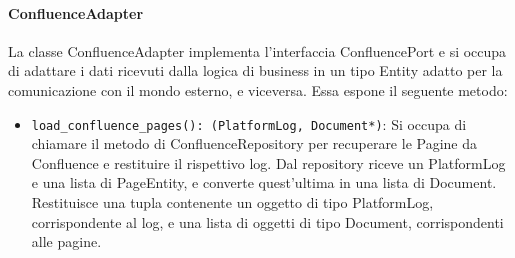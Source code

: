 \paragraph{ConfluenceAdapter}
\label{sec:confluence_adapter}
La classe ConfluenceAdapter implementa l'interfaccia ConfluencePort e si occupa di adattare i dati ricevuti dalla logica di business in un tipo Entity adatto per la comunicazione con il mondo esterno, e viceversa. Essa espone il seguente metodo:
\begin{itemize}
    \item \texttt{load\_confluence\_pages(): (PlatformLog, Document*)}: Si occupa di chiamare il metodo di ConfluenceRepository per recuperare le Pagine da Confluence e restituire il rispettivo log. Dal repository riceve un PlatformLog e una lista di PageEntity, e converte quest'ultima in una lista di Document. Restituisce una tupla contenente un oggetto di tipo PlatformLog, corrispondente al log, e una lista di oggetti di tipo Document, corrispondenti alle pagine.
\end{itemize}

